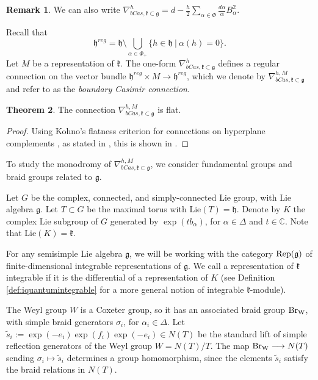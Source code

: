 \documentclass[10pt]{amsart}
\numberwithin{equation}{section}
\theoremstyle{definition}
\newtheorem{theorem}{Theorem}[section]
\newtheorem{remark}[theorem]{Remark}
\let\tilde=\widetilde
\def\C{{\mathbb C}}
\DeclareMathOperator{\BrW}{{\rm Br}_{W}}
\newcommand{\g}{\mathfrak{g}}
\newcommand{\h}{\mathfrak{h}}
\newcommand{\kompact}{\mathfrak{k}}
\begin{document}
\begin{remark}
    We can also write $\nabla_{bCas, \kompact\subset \g}^{h}=d- \frac{h}{2}\sum_{\alpha\in \Phi}\frac{d\alpha}{\alpha}B_{\alpha}^2$.
\end{remark}
    
    Recall that
    \[
    \h^{reg} = \h\setminus \bigcup_{\alpha \in \Phi_+}\{h\in \h \ | \ \alpha(h) = 0\}.
    \] 
    Let $M$ be a representation of $\kompact$. The one-form $\nabla_{bCas, \kompact\subset \g}^{h}$ defines a regular connection on the vector bundle $\h^{reg}\times M\rightarrow \h^{reg}$, which we denote by $\nabla_{bCas, \kompact\subset \g}^{h, M}$ and refer to as the \emph{boundary Casimir connection}.

\begin{theorem}
    The connection $\nabla_{bCas,\kompact\subset \g}^{h, M}$ is flat.
\end{theorem}
\begin{proof}
Using Kohno's flatness criterion for connections on hyperplane complements \cite{MR1046571}, as stated in \cite[Lemma 2.1]{Valerio-qWeyl}, this is shown in \cite[Theorem 8.7]{MR4983792}.
\end{proof}

To study the monodromy of $\nabla_{bCas,\kompact\subset \g}^{h,M}$, we consider fundamental groups and braid groups related to $\g$.

Let $G$ be the complex, connected, and simply-connected Lie group, with Lie algebra $\g$. Let $T\subset G$ be the maximal torus with $\mathrm{Lie}(T) = \h$. Denote by $K$ the complex Lie subgroup of $G$ generated by $\exp(t b_{\alpha})$, for $\alpha\in \Delta$ and $t\in \C$. Note that $\mathrm{Lie}(K) = \kompact$.

For any semisimple Lie algebra $\mathfrak{g}$, we will be working with the category ${\rm Rep}(\mathfrak{g})$ of finite-dimensional integrable representations of $\mathfrak{g}$. We call a representation of $\kompact$ integrable if it is the differential of a representation of $K$ (see Definition \ref{def:iquantumintegrable} for a more general notion of integrable $\kompact$-module).

The Weyl group $W$ is a Coxeter group, so it has an associated braid group $\BrW$, with simple braid generators $\sigma_i$, for $\alpha_i \in \Delta$. Let $\tilde{s}_{i}:=\exp(-e_i)\exp(f_i)\exp(-e_i)\in N(T)$ be the standard lift of simple reflection generators of the Weyl group $W = N(T)/T$. The map $\BrW\longrightarrow N(T)$ sending $\sigma_{i}\mapsto \tilde{s}_{i}$ determines a group homomorphism, since the elements $\tilde{s}_{i}$ satisfy the braid relations in $N(T)$.
\end{document}
